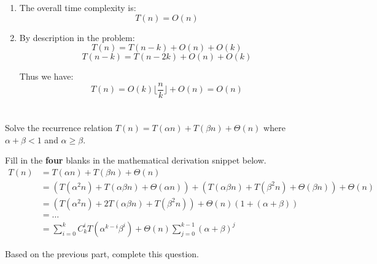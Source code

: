 \begin{parts}
\begin{solution}
\begin{enumerate}
            \item
                  The overall time complexity is:
                  $$T(n) = O(n)$$

            \item
                  By description in the problem:
                  $$T(n) = T(n-k) + O(n) + O(k)$$
                  $$T(n-k) = T(n-2k) + O(n) + O(k)$$

                  Thus we have:
                  $$T(n) = O(k) \lfloor\frac{n}{k}\rfloor + O(n) = O(n)$$
        \end{enumerate}
    \end{solution}

    \part{} Solve the recurrence relation $T(n) = T(\alpha n) + T(\beta n) + \Theta(n)$ where $\alpha + \beta < 1$ and $\alpha \geq \beta$.
    \begin{subparts}
        \subpart[2] Fill in the \textbf{four} blanks in the mathematical derivation snippet below.
        \begin{align*}
            T(n) & = T(\alpha n) + T(\beta n) + \Theta(n)                                                                \\
                 & = (T(\alpha ^2 n) + T(\alpha \beta n) + \Theta(\alpha n)) +
            (T(\alpha \beta n) + T(\beta ^2 n) + \Theta(\beta n)) + \Theta(n)                                            \\
                 & = (T(\alpha ^2 n) + 2T(\alpha \beta n) + T(\beta ^2 n)) + \Theta(n) (1 + (\alpha + \beta))            \\
                 & = \dots                                                                                               \\
                 & = \sum _ {i=0} ^k C_k^i T(\alpha^{k-i}\beta^{i}) + \Theta(n) \sum _ {j = 0} ^{k-1} (\alpha + \beta)^j
        \end{align*}

        \subpart[3] Based on the previous part, complete this question.
        \begin{solution}
            \vspace{3in}
        \end{solution}
    \end{subparts}


\end{parts}
